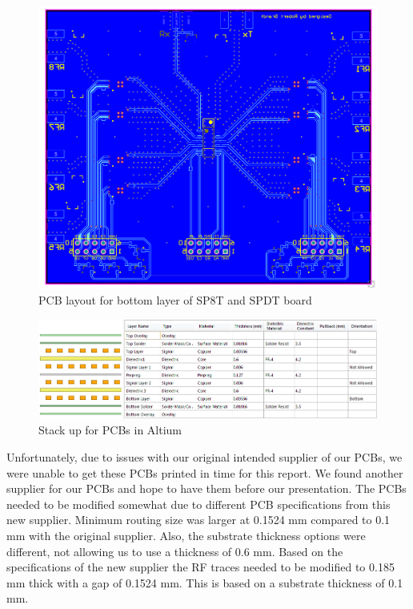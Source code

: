 \begin{figure}[h]
	\begin{center}
		\includegraphics[width=5.5in]{./images/sp8t_bottom.png}
		\caption{PCB layout for bottom layer of SP8T and SPDT board}
		\label{fig:sp8t_bottom}
	\end{center}
\end{figure}

\begin{figure}[h]
	\begin{center}
		\includegraphics[width=5in]{./images/stackup.png}
		\caption{Stack up for PCBs in Altium}
		\label{fig:stackup}
	\end{center}
\end{figure}


Unfortunately, due to issues with our original intended supplier of our PCBs, we were unable to get these PCBs printed in time for this report. We found another supplier for our PCBs and hope to have them before our presentation. The PCBs needed to be modified somewhat due to different PCB specifications from this new supplier. Minimum routing size was larger at 0.1524 mm compared to 0.1 mm with the original supplier. Also, the substrate thickness options were different, not allowing us to use a thickness of 0.6 mm. Based on the specifications of the new supplier the RF traces needed to be modified to 0.185 mm thick with a gap of 0.1524 mm. This is based on a substrate thickness of 0.1 mm.

